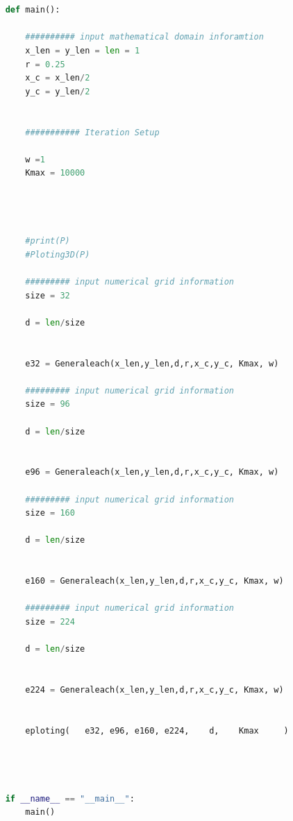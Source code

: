 \documentclass[12pt]{article}
\begin{document}
\begin{scriptsize}
\begin{lstlisting}[language=python,caption={The python Source code of Main Function}]

    
    def main():
    
        ########## input mathematical domain inforamtion
        x_len = y_len = len = 1
        r = 0.25
        x_c = x_len/2
        y_c = y_len/2
    
    
        ########### Iteration Setup
    
        w =1
        Kmax = 10000
    
    
        
    
        #print(P)
        #Ploting3D(P)
    
        ######### input numerical grid information
        size = 32
    
        d = len/size
    
    
        e32 = Generaleach(x_len,y_len,d,r,x_c,y_c, Kmax, w)
    
        ######### input numerical grid information
        size = 96
    
        d = len/size
    
    
        e96 = Generaleach(x_len,y_len,d,r,x_c,y_c, Kmax, w)
    
        ######### input numerical grid information
        size = 160
    
        d = len/size
    
    
        e160 = Generaleach(x_len,y_len,d,r,x_c,y_c, Kmax, w)
    
        ######### input numerical grid information
        size = 224
    
        d = len/size
    
    
        e224 = Generaleach(x_len,y_len,d,r,x_c,y_c, Kmax, w)
    
    
        eploting(   e32, e96, e160, e224,    d,    Kmax     )
        
    
    
    
    if __name__ == "__main__":
        main()
    


    
\end{lstlisting}
\end{scriptsize}
\end{document}
